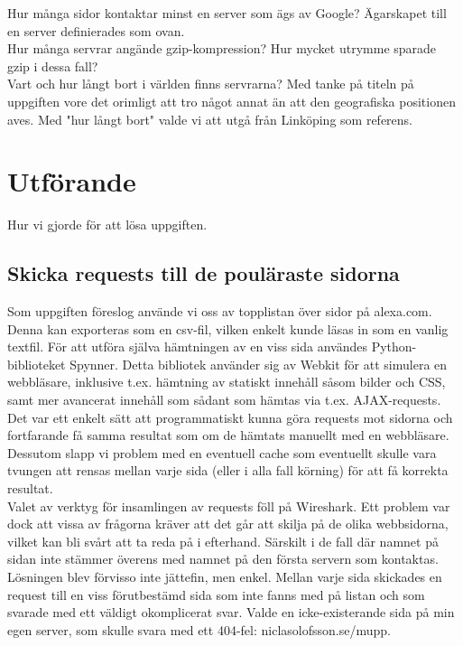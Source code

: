 \documentclass[a4paper]{article}
\begin{document}
Hur många sidor kontaktar minst en server som ägs av Google? Ägarskapet till en server definierades som ovan.\\

Hur många servrar angände gzip-kompression? Hur mycket utrymme sparade gzip i dessa fall?\\

Vart och hur långt bort i världen finns servrarna? Med tanke på titeln på uppgiften vore det orimligt att tro något annat än att den geografiska positionen aves. Med "hur långt bort" valde vi att utgå från Linköping som referens.


\section{Utförande}
Hur vi gjorde för att lösa uppgiften.

\subsection{Skicka requests till de pouläraste sidorna}
Som uppgiften föreslog använde vi oss av topplistan över sidor på alexa.com. Denna kan exporteras som en csv-fil, vilken enkelt kunde läsas in som en vanlig textfil. För att utföra själva hämtningen av en viss sida användes Python-biblioteket Spynner. Detta bibliotek använder sig av Webkit för att simulera en webbläsare, inklusive t.ex. hämtning av statiskt innehåll såsom bilder och CSS, samt mer avancerat innehåll som sådant som hämtas via t.ex. AJAX-requests. Det var ett enkelt sätt att programmatiskt kunna göra requests mot sidorna och fortfarande få samma resultat som om de hämtats manuellt med en webbläsare. Dessutom slapp vi problem med en eventuell cache som eventuellt skulle vara tvungen att rensas mellan varje sida (eller i alla fall körning) för att få korrekta resultat.\\

Valet av verktyg för insamlingen av requests föll på Wireshark. Ett problem var dock att vissa av frågorna kräver att det går att skilja på de olika webbsidorna, vilket kan bli svårt att ta reda på i efterhand. Särskilt i de fall där namnet på sidan inte stämmer överens med namnet på den första servern som kontaktas. Lösningen blev förvisso inte jättefin, men enkel. Mellan varje sida skickades en request till en viss förutbestämd sida som inte fanns med på listan och som svarade med ett väldigt okomplicerat svar. Valde en icke-existerande sida på min egen server, som skulle svara med ett 404-fel: niclasolofsson.se/mupp.\\
\end{document}
